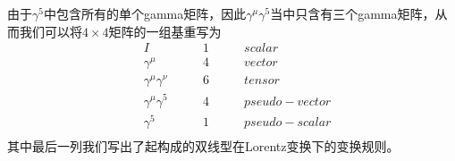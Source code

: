 由于$\gamma^{5}$中包含所有的单个gamma矩阵，因此$\gamma^{\mu}\gamma^{5}$当中只含有三个gamma矩阵，从而我们可以将$4\times 4$矩阵的一组基重写为
\begin{equation*}
    \begin{aligned}
    &I\quad\quad &1\quad\quad&scalar\\
    &\gamma^{\mu}\quad\quad &4\quad\quad&vector\\
    &\gamma^{\mu}\gamma^{\nu}\quad\quad &6\quad\quad&tensor\\
    &\gamma^{\mu}\gamma^{5}\quad\quad &4\quad\quad&pseudo-vector\\
    &\gamma^{5}\quad\quad &1\quad\quad&pseudo-scalar\\
    \end{aligned}
\end{equation*}
其中最后一列我们写出了起构成的双线型在Lorentz变换下的变换规则。

